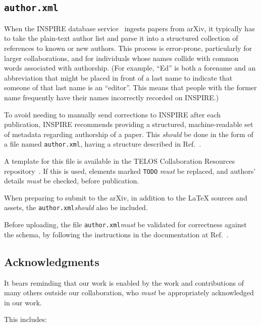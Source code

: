 \documentclass{article}
\newcommand\rfcword[1]{\emph{#1}\xspace}
\newcommand\must{\rfcword{must}}
\newcommand\should{\rfcword{should}}
\newcommand\filename[1]{\texttt{#1}\xspace}
\newcommand\authorxml{\filename{author.xml}}
\begin{document}
\subsection{\authorxml}

When the INSPIRE database service~\cite{inspire} ingests papers from arXiv,
it typically has to take the plain-text author list
and parse it into a structured collection of references to known or new authors.
This process is error-prone,
particularly for larger collaborations,
and for individuals whose names collide with common words associated with authorship.
(For example,
``Ed'' is both a forename
and an abbreviation that might be placed in front of a last name
to indicate that someone of that last name is an ``editor''.
This means that people with the former name frequently have their names
incorrectly recorded on INSPIRE.)

To avoid needing to manually send corrections to INSPIRE after each publication,
INSPIRE recommends providing
a structured, machine-readable set of metadata regarding authorship of a paper.
This \should be done in the form of a file named \authorxml,
having a structure described in Ref.~\cite{inspire-authorxml}.

A template for this file is available in the TELOS Collaboration Resources repository~\cite{resources}.
If this is used,
elements marked \verb|TODO| \must be replaced,
and authors' details \must be checked,
before publication.

When preparing to submit to the arXiv,
in addition to the LaTeX sources and assets,
the \authorxml \should also be included.

Before uploading,
the file \authorxml \must be validated for correctness against the schema,
by following the instructions in the documentation at Ref.~\cite{inspire-authorxml}.

\subsection{Acknowledgments}\label{sec:acknowledge}

It bears reminding that our work is enabled by
the work and contributions of many others outside our collaboration,
who \must be appropriately acknowledged in our work.

This includes:
\end{document}
